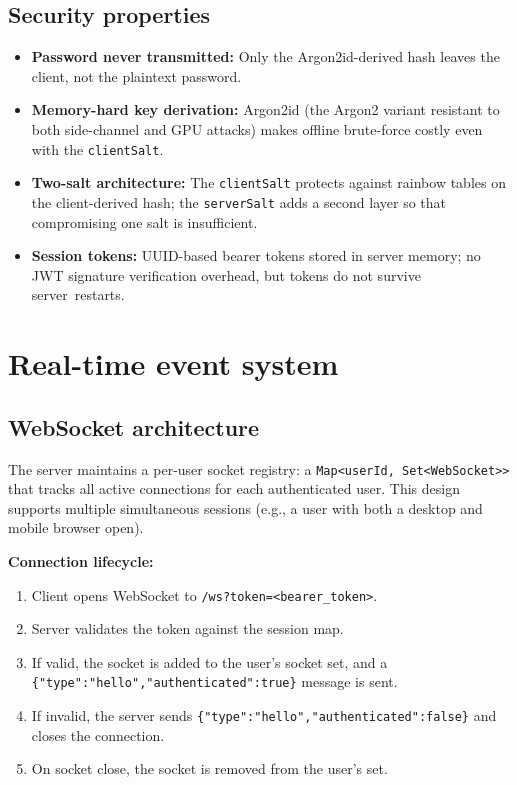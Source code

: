 \documentclass[13pt,a4paper]{report}
\begin{document}
\subsection{Security properties}
\begin{itemize}
    \item \textbf{Password never transmitted:} Only the Argon2id-derived hash leaves the client, not the plaintext password.
    \item \textbf{Memory-hard key derivation:} Argon2id (the Argon2 variant resistant to both side-channel and GPU attacks) makes offline brute-force costly even with the \texttt{clientSalt}.
    \item \textbf{Two-salt architecture:} The \texttt{client\-Salt} protects against rainbow tables on the client-derived hash; the \texttt{server\-Salt} adds a second layer so that compromising one salt is insufficient.
    \item \textbf{Session tokens:} UUID-based bearer tokens stored in server memory; no JWT signature verification overhead, but tokens do not survive server~restarts.
\end{itemize}

\section{Real-time event system}
\subsection{WebSocket architecture}
The server maintains a per-user socket registry: a \texttt{Map<userId, Set<WebSocket>>} that tracks all active connections for each authenticated user. This design supports multiple simultaneous sessions (e.g., a user with both a desktop and mobile browser open).

\textbf{Connection lifecycle:}
\begin{enumerate}
    \item Client opens WebSocket to \texttt{/ws?token=<bearer\_token>}.
    \item Server validates the token against the session map.
    \item If valid, the socket is added to the user's socket set, and a \texttt{\{"type":"hello","authenticated":true\}} message is sent.
    \item If invalid, the server sends \texttt{\{"type":"hello","authenticated":false\}} and closes the connection.
    \item On socket close, the socket is removed from the user's set.
\end{enumerate}
\end{document}
